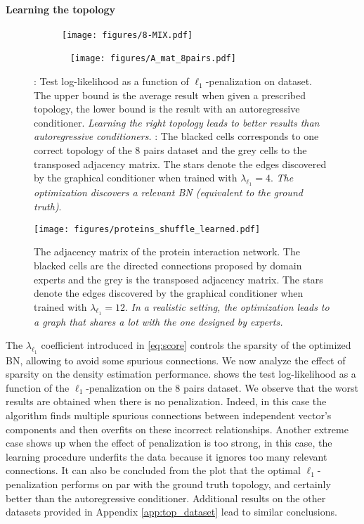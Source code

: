 \paragraph{Learning the topology}
\begin{figure}
    \begin{subfigure}{.27\textwidth}
    \texttt{[image: figures/8-MIX.pdf]}
    \caption{}\label{fig:8_MIX_L1_test}
    \end{subfigure}
    \begin{subfigure}{.2\textwidth}~
    \centering
        \texttt{[image: figures/A\_mat\_8pairs.pdf]}
    \caption{}\label{fig:8_MIX_L1_DAG}
    \end{subfigure}
    \caption{: Test log-likelihood as a function of $\ell_1$-penalization on  dataset. The upper bound is the average result when given a prescribed topology, the lower bound is the result with an autoregressive conditioner. \emph{Learning the right topology leads to better results than autoregressive conditioners.} : The blacked cells corresponds to one correct topology of the 8 pairs dataset and the grey cells to the transposed adjacency matrix. The stars denote the edges discovered by the graphical conditioner when trained with $\lambda_{\ell_1} = 4$. \emph{The optimization discovers a relevant BN (equivalent to the ground truth)}.}
    \label{fig:8_MIX_L1}
\end{figure}
\begin{figure}
    \centering
    \texttt{[image: figures/proteins\_shuffle\_learned.pdf]}
    \caption{The adjacency matrix of the protein interaction network. The blacked cells are the directed connections proposed by domain experts and the grey is the transposed adjacency matrix. The stars denote the edges discovered by the graphical conditioner when trained with  $\lambda_{\ell_1} = 12$. \emph{In a realistic setting, the optimization leads to a graph that shares a lot with the one designed by experts.}}    \label{fig:protein_net}

\end{figure}
The $\lambda_{\ell_1}$ coefficient introduced in \eqref{eq:score} controls the sparsity of the optimized BN, allowing to avoid some spurious connections. We now analyze the effect of sparsity on the density estimation performance.  shows the test log-likelihood as a function of the $\ell_1$-penalization on the 8 pairs dataset. We observe that the worst results are obtained when there is no penalization. Indeed, in this case the algorithm finds multiple spurious connections between independent vector's components and then overfits on these incorrect relationships. Another extreme case shows up when the effect of penalization is too strong, in this case, the learning procedure underfits the data because it ignores too many relevant connections. It can also be concluded from the plot that the optimal $\ell_1$-penalization performs on par with the ground truth topology, and certainly better than the autoregressive conditioner. Additional results on the other datasets provided in Appendix \ref{app:top_dataset} lead to similar conclusions.

